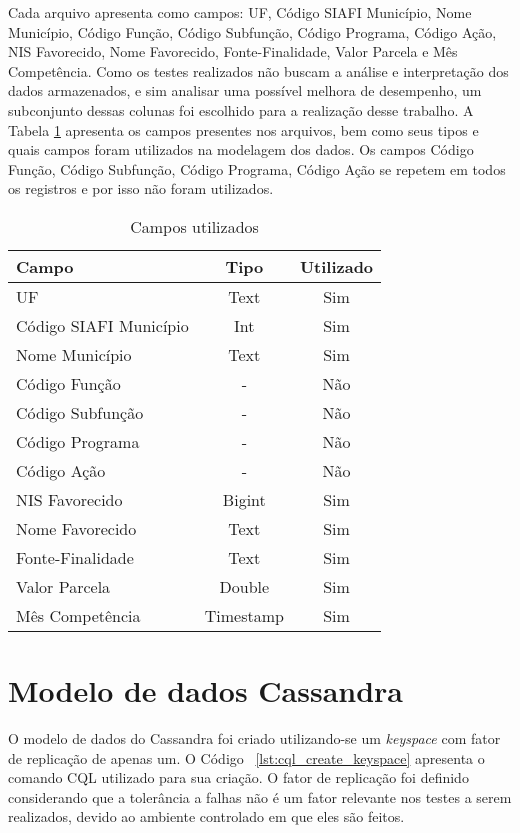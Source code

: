 Cada arquivo apresenta como campos: UF, Código SIAFI Município, Nome Município, Código Função, Código Subfunção, Código Programa, Código Ação, NIS Favorecido, Nome Favorecido, Fonte-Finalidade, Valor Parcela e Mês Competência. Como os testes realizados não buscam a análise e interpretação dos dados armazenados, e sim analisar uma possível melhora de desempenho, um subconjunto dessas colunas foi escolhido para a realização desse trabalho. A Tabela \ref{tab:colunas} apresenta os campos presentes nos arquivos, bem como seus tipos e quais campos foram utilizados na modelagem dos dados. Os campos Código Função, Código Subfunção, Código Programa, Código Ação se repetem em todos os registros e por isso não foram utilizados.

\begin{table}[]
	\centering
	\caption{Campos utilizados}
	\label{tab:colunas}
	\begin{tabular}{|l|c|c|}
		\hline
		\textbf{Campo}         & \textbf{Tipo} & \textbf{Utilizado} \\ \hline
		UF                     & Text          & Sim                \\ \hline
		Código SIAFI Município & Int           & Sim                \\ \hline
		Nome Município         & Text          & Sim                \\ \hline
		Código Função          & -             & Não                \\ \hline
		Código Subfunção       & -             & Não                \\ \hline
		Código Programa        & -             & Não                \\ \hline
		Código Ação            & -             & Não                \\ \hline
		NIS Favorecido         & Bigint        & Sim                \\ \hline
		Nome Favorecido        & Text          & Sim                \\ \hline
		Fonte-Finalidade       & Text          & Sim                \\ \hline
		Valor Parcela          & Double        & Sim                \\ \hline
		Mês Competência        & Timestamp     & Sim                \\ \hline
	\end{tabular}
\end{table}

\section{Modelo de dados Cassandra}
O modelo de dados do Cassandra foi criado utilizando-se um \emph{keyspace} com fator de replicação de apenas um. O Código ~\ref{lst:cql_create_keyspace} apresenta o comando CQL utilizado para sua criação. O fator de replicação foi definido considerando que a tolerância a falhas não é um fator relevante nos testes a serem realizados, devido ao ambiente controlado em que eles são feitos.

